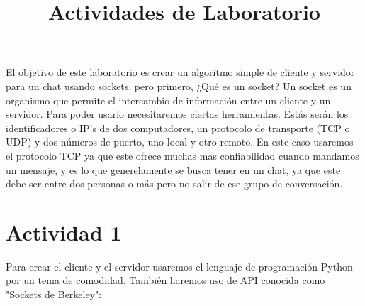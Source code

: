 \documentclass[onecolumn,11pts]{IEEEtran}
\begin{document}
\cleardoublepage
\listoffigures
\title{Actividades de Laboratorio}

\maketitle
    El objetivo de este laboratorio es crear un algoritmo simple de cliente y servidor para un chat usando sockets, pero primero, ¿Qué es un socket?
    Un socket es un organismo que permite el intercambio de información entre un cliente y un servidor. Para poder usarlo necesitaremos ciertas herramientas.
    Estás serán los identificadores o IP's de dos computadores, un protocolo de transporte (TCP o UDP) y dos números de puerto, uno local y otro remoto. En este caso usaremos el protocolo TCP ya que este ofrece muchas mas confiabilidad cuando mandamos un mensaje, y es lo que generelamente se busca tener en un chat, ya que este debe ser entre dos personas o más pero no salir de ese grupo de conversación.\\
\section{Actividad 1}
    Para crear el cliente y el servidor usaremos el lenguaje de programación Python por un tema de comodidad. También haremos uso de API conocida como "Sockets de Berkeley":
        
\end{document}
